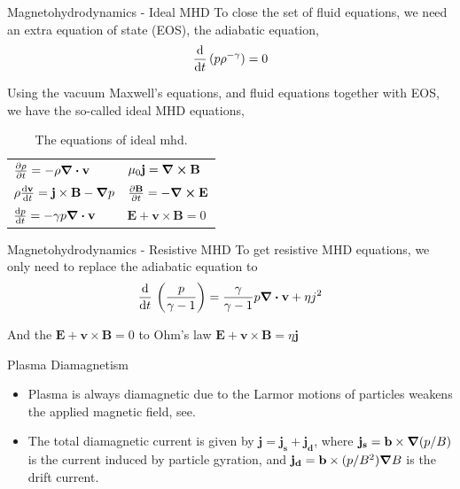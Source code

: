 \begin{frame}{Magnetohydrodynamics - Ideal MHD}
    To close the set of fluid equations, we need an extra equation of state (EOS), the adiabatic equation,
    \begin{equation}
        \dv{t}\,(p\rho^{-\gamma}) = 0
        \label{eq:adibatic-equation}
    \end{equation}

    Using the vacuum Maxwell's equations, and fluid equations together with EOS, we have the so-called ideal MHD equations,
    \begin{table}
        \centering
        \caption{The equations of ideal mhd.}
        \begin{tabular}{ll}
            \hline
            $\pdv{\rho}{t}           = -\rho\div\mathbf{v}           $ & $\mu_0\mathbf{j} = \curl\mathbf{B}$           \\
            $\rho\dv{\mathbf{v}}{t}  = \mathbf{j\times B} - \grad{p} $ & $\pdv{\mathbf{B}}{t}     = - \curl\mathbf{E}$ \\
            $\dv{p}{t}               = -\gamma p\div\mathbf{v}       $ & $\mathbf{E + v\times B}  = 0$                 \\
            \hline
        \end{tabular}
        \label{table:ideal-mhd}
    \end{table}
\end{frame}

\begin{frame}{Magnetohydrodynamics - Resistive MHD}
    To get resistive MHD equations, we only need to replace the adiabatic equation to
    \begin{equation}
        \dv{t}\,\left(\frac{p}{\gamma-1}\right) = \frac{\gamma}{\gamma-1}p\div\mathbf{v} + \eta j^2
        \label{eq:resistive-adibatic-equation}
    \end{equation}

    And the $\mathbf{E+v\times B} = 0$ to Ohm's law $\mathbf{E+v\times B} = \eta\mathbf{j}$
\end{frame}

\begin{frame}{Plasma Diamagnetism}
    \begin{itemize}
        \item Plasma is always diamagnetic due to the Larmor motions of particles weakens the applied magnetic field, see.
        \item The total diamagnetic current is given by $\mathbf{j = j_s + j_d}$, where $\mathbf{j_s} = \mathbf{b}\times\grad(p/B)$ is the current induced by particle gyration, and $\mathbf{j_d} = \mathbf{b}\times (p/B^2)\grad B$ is the drift current.
    \end{itemize}
\end{frame}

